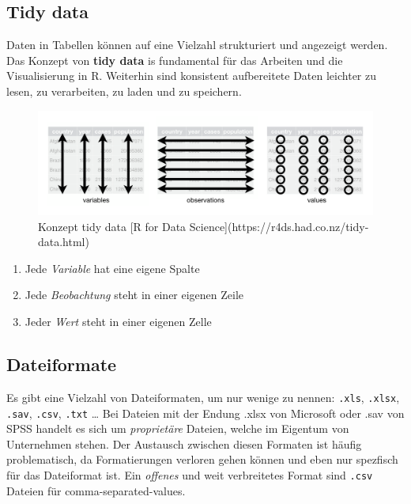 \documentclass[
]{article}
\providecommand{\tightlist}{%
  \setlength{\itemsep}{0pt}\setlength{\parskip}{0pt}}
\begin{document}
\hypertarget{tidy-data}{%
\subsection{Tidy data}\label{tidy-data}}

Daten in Tabellen können auf eine Vielzahl strukturiert und angezeigt werden. Das Konzept von \textbf{tidy data} is fundamental für das Arbeiten und die Visualisierung in R. Weiterhin sind konsistent aufbereitete Daten leichter zu lesen, zu verarbeiten, zu laden und zu speichern.

\begin{figure}

{\centering \includegraphics[width=1\linewidth]{images/021} 

}

\caption{Konzept tidy data [R for Data Science](https://r4ds.had.co.nz/tidy-data.html)}\label{fig:unnamed-chunk-106}
\end{figure}

\begin{enumerate}
\def\labelenumi{\arabic{enumi}.}
\tightlist
\item
  Jede \emph{Variable} hat eine eigene Spalte
\item
  Jede \emph{Beobachtung} steht in einer eigenen Zeile
\item
  Jeder \emph{Wert} steht in einer eigenen Zelle
\end{enumerate}

\hypertarget{dateiformate}{%
\subsection{Dateiformate}\label{dateiformate}}

Es gibt eine Vielzahl von Dateiformaten, um nur wenige zu nennen: \texttt{.xls}, \texttt{.xlsx}, \texttt{.sav}, \texttt{.csv}, \texttt{.txt} \ldots{}
Bei Dateien mit der Endung .xlsx von Microsoft oder .sav von SPSS handelt es sich um \emph{proprietäre} Dateien, welche im Eigentum von Unternehmen stehen. Der Austausch zwischen diesen Formaten ist häufig problematisch, da Formatierungen verloren gehen können und eben nur spezfisch für das Dateiformat ist. Ein \emph{offenes} und weit verbreitetes Format sind \texttt{.csv} Dateien für comma-separated-values.
\end{document}
